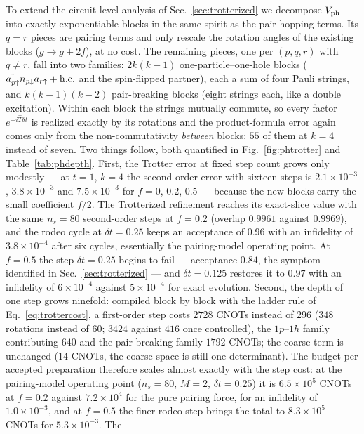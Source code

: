 \documentclass[
  aps,            %
  prc,            %
  reprint,        %
  superscriptaddress,
  floatfix,
  nofootinbib
]{revtex4-2}
\begin{document}
To extend the circuit-level analysis of Sec.~\ref{sec:trotterized} we
decompose $V_{\rm ph}$ into exactly exponentiable blocks in the same spirit as
the pair-hopping terms.  Its $q=r$ pieces are pairing terms and only rescale
the rotation angles of the existing blocks ($g\to g+2f$), at no cost.  The
remaining pieces, one per $(p,q,r)$ with $q\neq r$, fall into two families:
$2k(k-1)$ one-particle--one-hole blocks
($a^\dagger_{p\uparrow}n_{p\downarrow}a_{r\uparrow}+{\rm h.c.}$ and the
spin-flipped partner), each a sum of four Pauli strings, and $k(k-1)(k-2)$
pair-breaking blocks (eight strings each, like a double excitation).  Within
each block the strings mutually commute, so every factor $e^{-i\hat T\delta t}$
is realized exactly by its rotations and the product-formula error again comes
only from the non-commutativity \emph{between} blocks: $55$ of them at $k=4$
instead of seven.  Two things follow, both quantified in
Fig.~\ref{fig:phtrotter} and Table~\ref{tab:phdepth}.  First, the Trotter
error at fixed step count grows only modestly --- at $t=1$, $k=4$ the
second-order error with sixteen steps is $2.1\times10^{-3}$, $3.8\times10^{-3}$
and $7.5\times10^{-3}$ for $f=0$, $0.2$, $0.5$ --- because the new blocks carry
the small coefficient $f/2$.  The Trotterized refinement reaches its
exact-slice value with the same $n_s=80$ second-order steps at $f=0.2$ (overlap
$0.9961$ against $0.9969$), and the rodeo cycle at $\delta t=0.25$ keeps an
acceptance of $0.96$ with an infidelity of $3.8\times10^{-4}$ after six cycles,
essentially the pairing-model operating point.  At $f=0.5$ the step
$\delta t=0.25$ begins to fail --- acceptance $0.84$, the symptom identified in
Sec.~\ref{sec:trotterized} --- and $\delta t=0.125$ restores it to $0.97$ with
an infidelity of $6\times10^{-4}$ against $5\times10^{-4}$ for exact evolution.
Second, the depth of one step grows ninefold: compiled block by block with
the ladder rule of Eq.~\eqref{eq:trottercost}, a first-order step costs $2728$
CNOTs instead of $296$ ($348$ rotations instead of $60$; $3424$ against $416$
once controlled), the $1p$--$1h$ family contributing $640$ and the
pair-breaking family $1792$ CNOTs; the coarse term is unchanged ($14$ CNOTs,
the coarse space is still one determinant).  The budget per accepted
preparation therefore scales almost exactly with the step cost: at the
pairing-model operating point ($n_s=80$, $M=2$, $\delta t=0.25$) it is
$6.5\times10^{5}$ CNOTs at $f=0.2$ against $7.2\times10^{4}$ for the pure pairing
force, for an infidelity of $1.0\times10^{-3}$, and at $f=0.5$ the finer rodeo
step brings the total to $8.3\times10^{5}$ CNOTs for $5.3\times10^{-3}$.  The
\end{document}
